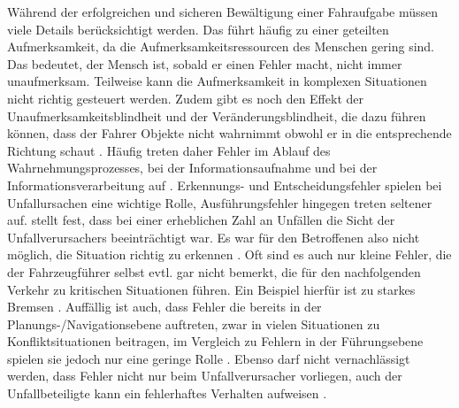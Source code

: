 Während der erfolgreichen und sicheren Bewältigung einer Fahraufgabe müssen viele Details berücksichtigt werden. Das führt häufig zu einer geteilten Aufmerksamkeit, da die Aufmerksamkeitsressourcen des Menschen gering sind. Das bedeutet, der Mensch ist, sobald er einen Fehler macht, nicht immer unaufmerksam. Teilweise kann die Aufmerksamkeit in komplexen Situationen nicht richtig gesteuert werden. Zudem gibt es noch den Effekt der Unaufmerksamkeitsblindheit und der Veränderungsblindheit, die dazu führen können, dass der Fahrer Objekte nicht wahrnimmt obwohl er in die entsprechende Richtung schaut \parencite[S. 31-33]{Gerstenberger.17.02.2015}. Häufig treten daher Fehler im Ablauf des Wahrnehmungsprozesses, bei der Informationsaufnahme und bei der Informationsverarbeitung auf \parencite[S. 47]{DEKRA.2017}. Erkennungs- und Entscheidungsfehler spielen bei Unfallursachen eine wichtige Rolle, Ausführungsfehler hingegen treten seltener auf. \Textcite [S. 152]{Grundl.2005} stellt fest, dass bei einer erheblichen Zahl an Unfällen die Sicht der Unfallverursachers beeinträchtigt war. Es war für den Betroffenen also nicht möglich, die Situation richtig zu erkennen \parencite[S. 152]{Grundl.2005}. Oft sind es auch nur kleine Fehler, die der Fahrzeugführer selbst evtl. gar nicht bemerkt, die für den nachfolgenden Verkehr zu kritischen Situationen führen. Ein Beispiel hierfür ist zu starkes Bremsen \parencite[S. 1]{Hoffmann.26.04.2013}. Auffällig ist auch, dass Fehler die bereits in der Planungs-/Navigationsebene auftreten, zwar in vielen Situationen zu Konfliktsituationen beitragen, im Vergleich zu Fehlern in der Führungsebene spielen sie jedoch nur eine geringe Rolle \parencite[S. 39f]{Reichart.2001}. Ebenso darf nicht vernachlässigt werden, dass Fehler nicht nur beim Unfallverursacher vorliegen, auch der Unfallbeteiligte kann ein fehlerhaftes Verhalten aufweisen \parencite[S. 107]{Grundl.2005}.

